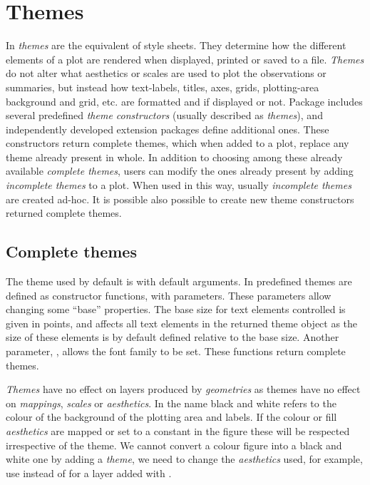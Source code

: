 \documentclass[krantz2]{krantz}\usepackage{knitr}%
\begin{document}
\section{Themes}\label{sec:plot:themes}
In \ggplot \emph{themes} are the equivalent of style sheets. They determine how the different elements of a plot are rendered when displayed, printed or saved to a file. \emph{Themes} do not alter what aesthetics or scales are used to plot the observations or summaries, but instead how text-labels, titles, axes, grids, plotting-area background and grid, etc. are formatted and if displayed or not. Package \ggplot includes several predefined \emph{theme constructors} (usually described as \emph{themes}), and independently developed extension packages define additional ones. These constructors return complete themes, which when added to a plot, replace any theme already present in whole. In addition to choosing among these already available \emph{complete themes}, users can modify the ones already present by adding \emph{incomplete themes} to a plot. When used in this way, usually \emph{incomplete themes} are created ad-hoc. It is possible also possible to create new theme constructors returned complete themes.

\subsection{Complete themes}
The theme used by default is  with default arguments. In  predefined themes are defined as constructor functions, with parameters. These parameters allow changing some ``base'' properties. The base size for text elements controlled is given in points, and affects all text elements in the returned theme object as the size of these elements is by default defined relative to the base size. Another parameter, , allows the font family to be set. These functions return complete themes.

\begin{warningbox}
\emph{Themes} have no effect on layers produced by \emph{geometries} as themes have no effect on \emph{mappings}, \emph{scales} or \emph{aesthetics}. In the name  black and white refers to the colour of the background of the plotting area and labels. If the colour or fill \emph{aesthetics} are mapped or set to a constant in the figure these will be respected irrespective of the theme. We cannot convert a colour figure into a black and white one by adding a \emph{theme}, we need to change the \emph{aesthetics} used, for example, use  instead of  for a layer added with .
\end{warningbox}
\end{document}
